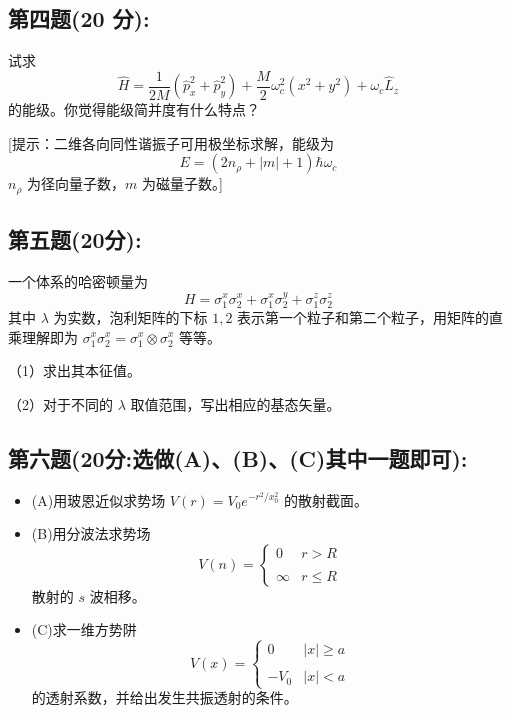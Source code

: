 \subsection{第四题(20 分):}
试求
\[\hat{H} = \frac{1}{2M} \left( \hat{p}_x^2 + \hat{p}_y^2 \right) + \frac{M}{2} \omega_c^2 \left( x^2 + y^2 \right) + \omega_c \hat{L}_z~\]
的能级。你觉得能级简并度有什么特点？

[提示：二维各向同性谐振子可用极坐标求解，能级为 
\[E = \left( 2n_\rho + |m| + 1 \right) \hbar \omega_c~\]
 $n_\rho$ 为径向量子数，$m$ 为磁量子数。]
\subsection{第五题(20分):}
一个体系的哈密顿量为 
\[H = \sigma_1^x \sigma_2^x + \sigma_1^x \sigma_2^y + \sigma_1^z \sigma_2^z ~\]
其中 $\lambda$ 为实数，泡利矩阵的下标 $1, 2$ 表示第一个粒子和第二个粒子，用矩阵的直乘理解即为 $\sigma_1^x \sigma_2^x = \sigma_1^x \otimes \sigma_2^x$ 等等。

（1）求出其本征值。

（2）对于不同的 $\lambda$ 取值范围，写出相应的基态矢量。
\subsection{第六题(20分:选做(A)、(B)、(C)其中一题即可):}
\begin{itemize}
    \item (A)用玻恩近似求势场 $V(r) = V_0 e^{-r^2 / x_0^2}$ 的散射截面。
    \item (B)用分波法求势场 
    \[    V(n) = \begin{cases}        0 & r > R \\\\        \infty & r \leq R    \end{cases} ~\]
    散射的 $s$ 波相移。
    \item (C)求一维方势阱 
    \[    V(x) = \begin{cases}        0 & |x| \geq a \\\\        -V_0 & |x| < a    \end{cases} ~\]
    的透射系数，并给出发生共振透射的条件。
\end{itemize}